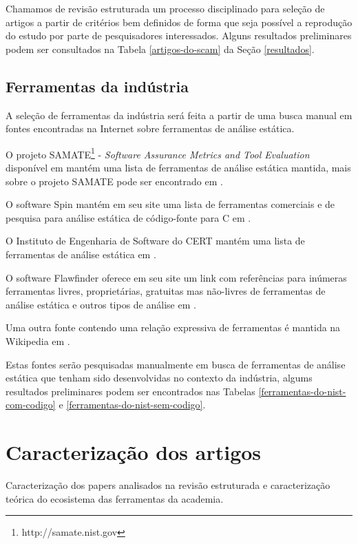 \documentclass[qual, classic, a4paper]{ufbathesis}
\begin{document}
Chamamos de revisão estruturada um processo disciplinado para seleção de
artigos a partir de critérios bem definidos de forma que seja possível a
reprodução do estudo por parte de pesquisadores interessados. Alguns
resultados preliminares podem ser consultados na Tabela \ref{artigos-do-scam}
da Seção \ref{resultados}.

\subsection{Ferramentas da indústria}

A seleção de ferramentas da indústria será feita a partir de uma busca manual
em fontes encontradas na Internet sobre ferramentas de análise estática.

O projeto SAMATE\footnote{
http://samate.nist.gov} - {\em Software Assurance Metrics and Tool Evaluation}
disponível em  mantém uma lista de
ferramentas de análise estática mantida, mais sobre o projeto SAMATE pode
ser encontrado em .

O software Spin mantém em seu site uma lista de ferramentas comerciais e de
pesquisa para análise estática de código-fonte para C em
.

O Instituto de Engenharia de Software do CERT mantém uma lista de ferramentas
de análise estática em .

O software Flawfinder oferece em seu site um link com referências para
inúmeras ferramentas livres, proprietárias, gratuitas mas não-livres de
ferramentas de análise estática e outros tipos de análise em
.

Uma outra fonte contendo uma relação expressiva de ferramentas é mantida na
Wikipedia em .

Estas fontes serão pesquisadas manualmente em busca de ferramentas de análise
estática que tenham sido desenvolvidas no contexto da indústria, algums
resultados preliminares podem ser encontrados nas Tabelas
\ref{ferramentas-do-nist-com-codigo} e \ref{ferramentas-do-nist-sem-codigo}.

\section{Caracterização dos artigos}

Caracterização dos papers analisados na revisão estruturada e caracterização
teórica do ecosistema das ferramentas da academia.
\end{document}
